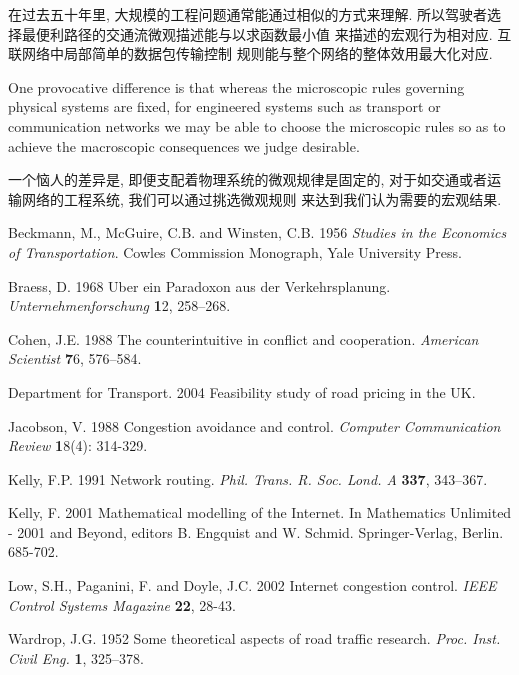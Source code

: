 \documentclass[a4paper,12pt, twocolumn]{article}
\begin{document}
在过去五十年里, 大规模的工程问题通常能通过相似的方式来理解. 
所以驾驶者选择最便利路径的交通流微观描述能与以求函数最小值
来描述的宏观行为相对应. 互联网络中局部简单的数据包传输控制
规则能与整个网络的整体效用最大化对应. 

One provocative difference is that
whereas the microscopic rules governing physical systems
are fixed, for engineered systems such as transport 
or communication networks we may be able to choose 
the microscopic rules
so as to achieve the  macroscopic consequences we
judge desirable. 

一个恼人的差异是, 即便支配着物理系统的微观规律是固定的, 
对于如交通或者运输网络的工程系统, 我们可以通过挑选微观规则
来达到我们认为需要的宏观结果. 

\begin{thebibliography}{9}

Beckmann, M.,  McGuire,  C.B. and Winsten, C.B.  1956 \textit{Studies in the
Economics of Transportation}. Cowles Commission Monograph, Yale
University Press.

Braess, D. 1968 Uber ein Paradoxon aus der Verkehrsplanung. \textit{
Unternehmenforschung} {\textbf 12}, 258--268.

Cohen, J.E. 1988 The counterintuitive in conflict and cooperation.
\textit{American Scientist} {\textbf 76}, 576--584.

Department for Transport. 2004  Feasibility study of road pricing in the
UK. 

 Jacobson, V. 1988 Congestion avoidance and control.
\textit{Computer Communication Review} {\textbf18}(4): 314-329.

Kelly, F.P. 1991 Network routing.
\textit{ Phil. Trans. R. Soc. Lond. A} \textbf{337}, 343--367.

Kelly, F. 2001 Mathematical modelling of the Internet.
In Mathematics Unlimited - 2001 and Beyond,
editors B. Engquist and W. Schmid. Springer-Verlag, Berlin. 685-702. 

 Low, S.H., Paganini, F. and Doyle, J.C. 2002 Internet
congestion control. \textit{IEEE Control Systems Magazine} \textbf{22},
28-43.

Wardrop, J.G. 1952 Some theoretical aspects of road traffic research.
\textit{Proc. Inst. Civil Eng.} \textbf{1}, 325--378.

\end{thebibliography}
\end{document}
